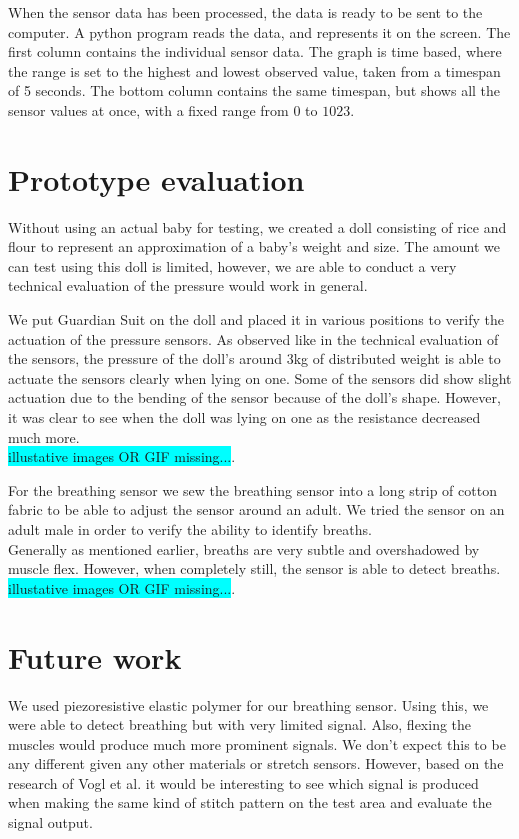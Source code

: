 \documentclass{sigchi-ext}
\begin{document}
When the sensor data has been processed, the data is ready to be sent to the computer. A python program reads the data, and represents it on the screen.
The first column contains the individual sensor data. The graph is time based, where the range is set to the highest and lowest observed value, taken from a timespan of 5 seconds.
The bottom column contains the same timespan, but shows all the sensor values at once, with a fixed range from $0$ to $1023$.


\section{Prototype evaluation}
Without using an actual baby for testing, we created a
doll consisting of rice and flour to represent an
approximation of a baby's weight and size. The amount we 
can test using this doll is limited, however, we are able 
to conduct a very technical evaluation of the pressure 
would work in general.

We put Guardian Suit on the doll and placed it in various
positions to verify the actuation of the pressure sensors.
As observed like in the technical evaluation of the sensors,
the pressure of the doll's around 3kg of distributed weight
is able to actuate the sensors clearly when lying on one. 
Some of the sensors did show slight actuation due to the
bending of the sensor because of the doll's shape. However,
it was clear to see when the doll was lying on one as the 
resistance decreased much more.\\
\colorbox{cyan}{illustative images OR GIF missing...}.

For the breathing sensor we sew the breathing sensor into
a long strip of cotton fabric to be able to adjust the 
sensor around an adult. We tried the sensor on an 
adult male in order to verify the ability to identify 
breaths.\\
Generally as mentioned earlier, breaths are very subtle and
overshadowed by muscle flex. However, when completely still,
the sensor is able to detect breaths.\\
\colorbox{cyan}{illustative images OR GIF missing...}.

\section{Future work}
We used piezoresistive elastic polymer for our breathing sensor. Using this,
we were able to detect breathing but with very limited signal. Also, flexing the muscles
would produce much more prominent signals. We don't expect this to be any
different given any other materials or stretch sensors. However,
based on the research of Vogl et al. \cite{stretcheband} it would be interesting
to see which signal is produced when making the same kind of stitch pattern on
the test area and evaluate the signal output.
\end{document}
